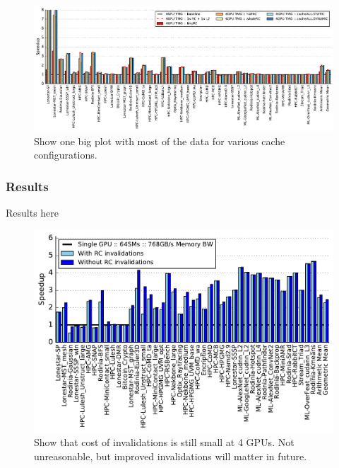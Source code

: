 \begin{figure}[tp]
    \centering
    \includegraphics[width=1.0\textwidth]{figures/plot_remote_cache_WB.pdf}
    \caption{Show one big plot with most of the data for various cache 
configurations.}
    \label{fig:caching}
\end{figure}


\subsubsection{Results}
Results here

\begin{figure}[t]
    \centering
    \includegraphics[width=1.0\columnwidth]{figures/plot_no_inval_WB.pdf}
    \caption{Show that cost of invalidations is still small at 4 GPUs.  Not 
unreasonable, but improved invalidations will matter in future.}
    \label{fig:invalidations}
\end{figure}

